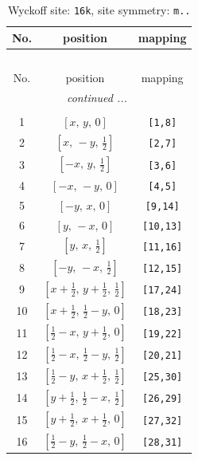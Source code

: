 \documentclass[fleqn,8pt]{jsarticle}
\begin{document}
\renewcommand{\arraystretch}{1.2}
\begin{longtable}{ccc}
\caption{Wyckoff site: {\tt 16k}, site symmetry: {\tt m..}}
 \\
 \hline \hline
No. & position & mapping \\ \hline \endfirsthead

\multicolumn{2}{l}{\tablename\ \thetable{}} \\
 \hline \hline
No. & position & mapping \\ \hline \endhead

 \hline \hline
\multicolumn{2}{r}{\footnotesize\it continued ...} \\ \endfoot

 \hline \hline
\multicolumn{2}{r}{} \\ \endlastfoot

1 & $\left[ x,\, y,\, 0 \right]$ & {\tt [1,8]} \\ \hline
2 & $\left[ x,\, - y,\, \frac{1}{2} \right]$ & {\tt [2,7]} \\ \hline
3 & $\left[ - x,\, y,\, \frac{1}{2} \right]$ & {\tt [3,6]} \\ \hline
4 & $\left[ - x,\, - y,\, 0 \right]$ & {\tt [4,5]} \\ \hline
5 & $\left[ - y,\, x,\, 0 \right]$ & {\tt [9,14]} \\ \hline
6 & $\left[ y,\, - x,\, 0 \right]$ & {\tt [10,13]} \\ \hline
7 & $\left[ y,\, x,\, \frac{1}{2} \right]$ & {\tt [11,16]} \\ \hline
8 & $\left[ - y,\, - x,\, \frac{1}{2} \right]$ & {\tt [12,15]} \\ \hline
9 & $\left[ x + \frac{1}{2},\, y + \frac{1}{2},\, \frac{1}{2} \right]$ & {\tt [17,24]} \\ \hline
10 & $\left[ x + \frac{1}{2},\, \frac{1}{2} - y,\, 0 \right]$ & {\tt [18,23]} \\ \hline
11 & $\left[ \frac{1}{2} - x,\, y + \frac{1}{2},\, 0 \right]$ & {\tt [19,22]} \\ \hline
12 & $\left[ \frac{1}{2} - x,\, \frac{1}{2} - y,\, \frac{1}{2} \right]$ & {\tt [20,21]} \\ \hline
13 & $\left[ \frac{1}{2} - y,\, x + \frac{1}{2},\, \frac{1}{2} \right]$ & {\tt [25,30]} \\ \hline
14 & $\left[ y + \frac{1}{2},\, \frac{1}{2} - x,\, \frac{1}{2} \right]$ & {\tt [26,29]} \\ \hline
15 & $\left[ y + \frac{1}{2},\, x + \frac{1}{2},\, 0 \right]$ & {\tt [27,32]} \\ \hline
16 & $\left[ \frac{1}{2} - y,\, \frac{1}{2} - x,\, 0 \right]$ & {\tt [28,31]} \\
\end{longtable}
\end{document}
